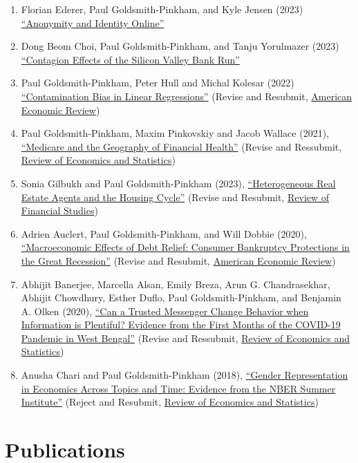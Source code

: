 \documentclass[letterpaper]{article}
\begin{document}
\begin{enumerate}
\item Florian Ederer, Paul Goldsmith-Pinkham, and Kyle Jensen (2023) \href{https://florianederer.github.io/ejmr.pdf}{``Anonymity and Identity Online''}
\item Dong Beom Choi, Paul Goldsmith-Pinkham, and Tanju Yorulmazer (2023) \href{https://arxiv.org/pdf/2308.06642.pdf}{``Contagion Effects of the Silicon Valley Bank Run''}
\item Paul Goldsmith-Pinkham, Peter Hull and Michal Kolesar (2022) \href{https://arxiv.org/abs/2106.05024}{``Contamination Bias in Linear Regressions''} (Revise and Resubmit, \ul{American Economic Review})
\item Paul Goldsmith-Pinkham, Maxim Pinkovskiy and Jacob Wallace (2021), \href{http://paulgp.github.io/papers/GPW_compressed.pdf}{``Medicare and the Geography of Financial Health''} (Revise and Ressubmit, \ul{Review of Economics and Statistics})
\item Sonia Gilbukh and Paul Goldsmith-Pinkham (2023), \href{http://paulgp.github.io/papers/Heterogeneous_Real_Estate_Agents_and_the_Housing_Cycle.pdf}{``Heterogeneous Real Estate Agents and the Housing Cycle''} (Revise and Resubmit, \ul{Review of Financial Studies})
\item Adrien Auclert, Paul Goldsmith-Pinkham, and Will Dobbie (2020), \href{http://paulgp.github.io/papers/Macroeconomic_Effects_of_Debt_Relief_Posting_342019.pdf}{``Macroeconomic Effects of Debt Relief: Consumer Bankruptcy Protections in the Great Recession''} (Revise and Resubmit, \ul{American Economic Review})
\item Abhijit Banerjee, Marcella Alsan, Emily Breza, Arun G. Chandrasekhar, Abhijit Chowdhury, Esther Duflo, Paul Goldsmith-Pinkham, and Benjamin A. Olken (2020), \href{https://economics.mit.edu/sites/default/files/2022-08/wb_manuscript_final.pdf}{``Can a Trusted Messenger Change Behavior when Information is Plentiful? Evidence from the First Months of the COVID-19 Pandemic in West Bengal''}  (Revise and Ressubmit, \ul{Review of Economics and Statistics})
\item Anusha Chari and  Paul Goldsmith-Pinkham (2018), \href{http://paulgp.github.io/papers/cgp_nbergender.pdf}{``Gender Representation in Economics Across Topics and Time: Evidence from the NBER Summer Institute''} (Reject and Resubmit, \ul{Review of Economics and Statistics})
\end{enumerate}

\section*{Publications}
\end{document}
